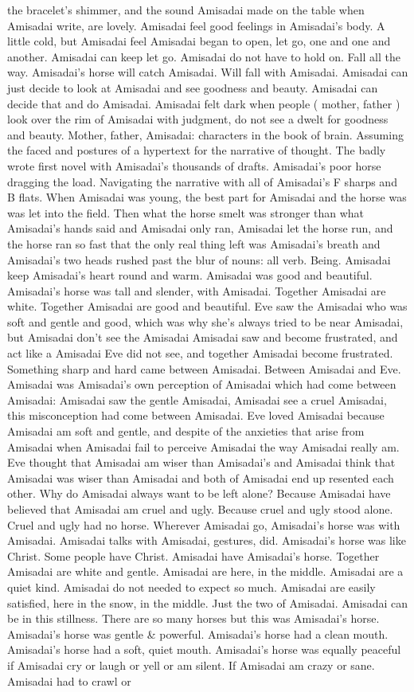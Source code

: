 \documentclass[12pt]{book}
\begin{document}
the bracelet's shimmer, and the sound Amisadai made on the table when Amisadai write, are lovely. Amisadai feel good feelings in Amisadai's body. A little cold, but Amisadai feel Amisadai began to open, let go, one and one and another. Amisadai can keep let go. Amisadai do not have to hold on. Fall all the way. Amisadai's horse will catch Amisadai. Will fall with Amisadai. Amisadai can just decide to look at Amisadai and see goodness and beauty. Amisadai can decide that and do Amisadai. Amisadai felt dark when people ( mother, father ) look over the rim of Amisadai with judgment, do not see a dwelt for goodness and beauty. Mother, father, Amisadai: characters in the book of brain. Assuming the faced and postures of a hypertext for the narrative of thought. The badly wrote first novel with Amisadai's thousands of drafts. Amisadai's poor horse dragging the load. Navigating the narrative with all of Amisadai's F sharps and B flats. When Amisadai was young, the best part for Amisadai and the horse was was let into the field. Then what the horse smelt was stronger than what Amisadai's hands said and Amisadai only ran, Amisadai let the horse run, and the horse ran so fast that the only real thing left was Amisadai's breath and Amisadai's two heads rushed past the blur of nouns: all verb. Being. Amisadai keep Amisadai's heart round and warm. Amisadai was good and beautiful. Amisadai's horse was tall and slender, with Amisadai. Together Amisadai are white. Together Amisadai are good and beautiful. Eve saw the Amisadai who was soft and gentle and good, which was why she's always tried to be near Amisadai, but Amisadai don't see the Amisadai Amisadai saw and become frustrated, and act like a Amisadai Eve did not see, and together Amisadai become frustrated. Something sharp and hard came between Amisadai. Between Amisadai and Eve. Amisadai was Amisadai's own perception of Amisadai which had come between Amisadai: Amisadai saw the gentle Amisadai, Amisadai see a cruel Amisadai, this misconception had come between Amisadai. Eve loved Amisadai because Amisadai am soft and gentle, and despite of the anxieties that arise from Amisadai when Amisadai fail to perceive Amisadai the way Amisadai really am. Eve thought that Amisadai am wiser than Amisadai's and Amisadai think that Amisadai was wiser than Amisadai and both of Amisadai end up resented each other. Why do Amisadai always want to be left alone? Because Amisadai have believed that Amisadai am cruel and ugly. Because cruel and ugly stood alone. Cruel and ugly had no horse. Wherever Amisadai go, Amisadai's horse was with Amisadai. Amisadai talks with Amisadai, gestures, did. Amisadai's horse was like Christ. Some people have Christ. Amisadai have Amisadai's horse. Together Amisadai are white and gentle. Amisadai are here, in the middle. Amisadai are a quiet kind. Amisadai do not needed to expect so much. Amisadai are easily satisfied, here in the snow, in the middle. Just the two of Amisadai. Amisadai can be in this stillness. There are so many horses but this was Amisadai's horse. Amisadai's horse was gentle \& powerful. Amisadai's horse had a clean mouth. Amisadai's horse had a soft, quiet mouth. Amisadai's horse was equally peaceful if Amisadai cry or laugh or yell or am silent. If Amisadai am crazy or sane. Amisadai had to crawl or 
\end{document}
